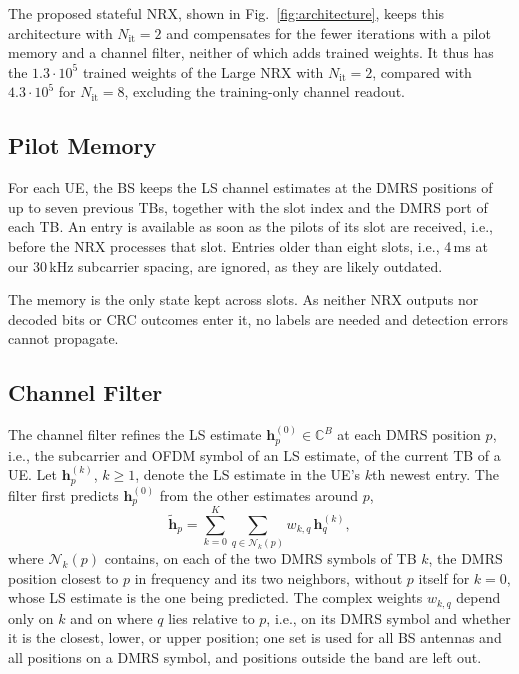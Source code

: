 The proposed stateful NRX, shown in Fig.~\ref{fig:architecture}, keeps this architecture with $N_{\mathrm{it}}=2$ and compensates for the fewer iterations with a pilot memory and a channel filter, neither of which adds trained weights. It thus has the $1.3\cdot 10^{5}$ trained weights of the Large NRX with $N_{\mathrm{it}}=2$, compared with $4.3\cdot 10^{5}$ for $N_{\mathrm{it}}=8$, excluding the training-only channel readout.

\subsection{Pilot Memory}
For each UE, the BS keeps the LS channel estimates at the DMRS positions of up to seven previous TBs, together with the slot index and the DMRS port of each TB. An entry is available as soon as the pilots of its slot are received, i.e., before the NRX processes that slot. Entries older than eight slots, i.e., 4\,ms at our 30\,kHz subcarrier spacing, are ignored, as they are likely outdated.

The memory is the only state kept across slots. As neither NRX outputs nor decoded bits or CRC outcomes enter it, no labels are needed and detection errors cannot propagate.

\subsection{Channel Filter}
The channel filter refines the LS estimate $\mathbf{h}^{(0)}_{p}\in\mathbb{C}^{B}$ at each DMRS position $p$, i.e., the subcarrier and OFDM symbol of an LS estimate, of the current TB of a UE. Let $\mathbf{h}^{(k)}_{p}$, $k\geq 1$, denote the LS estimate in the UE's $k$th newest entry. The filter first predicts $\mathbf{h}^{(0)}_{p}$ from the other estimates around $p$,
\begin{equation}
\tilde{\mathbf{h}}_{p}=\sum_{k=0}^{K}\sum_{q\in\mathcal{N}_{k}(p)}w_{k,q}\,\mathbf{h}^{(k)}_{q},
\label{eq:prediction}
\end{equation}
where $\mathcal{N}_{k}(p)$ contains, on each of the two DMRS symbols of TB $k$, the DMRS position closest to $p$ in frequency and its two neighbors, without $p$ itself for $k=0$, whose LS estimate is the one being predicted. The complex weights $w_{k,q}$ depend only on $k$ and on where $q$ lies relative to $p$, i.e., on its DMRS symbol and whether it is the closest, lower, or upper position; one set is used for all BS antennas and all positions on a DMRS symbol, and positions outside the band are left out.

